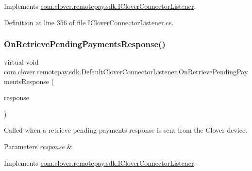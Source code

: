 Implements \hyperlink{interfacecom_1_1clover_1_1remotepay_1_1sdk_1_1_i_clover_connector_listener_a80b66ca256c60f88d9c3bc1bf7df1a25}{com.\+clover.\+remotepay.\+sdk.\+I\+Clover\+Connector\+Listener}.



Definition at line 356 of file I\+Clover\+Connector\+Listener.\+cs.

\mbox{\label{classcom_1_1clover_1_1remotepay_1_1sdk_1_1_default_clover_connector_listener_afb505c42e77209a31ce61911641f40cf}} 
\subsubsection{\texorpdfstring{On\+Retrieve\+Pending\+Payments\+Response()}{OnRetrievePendingPaymentsResponse()}}
{\footnotesize\ttfamily virtual void com.\+clover.\+remotepay.\+sdk.\+Default\+Clover\+Connector\+Listener.\+On\+Retrieve\+Pending\+Payments\+Response (\begin{DoxyParamCaption}\item[{\hyperlink{classcom_1_1clover_1_1remotepay_1_1sdk_1_1_retrieve_pending_payments_response}{Retrieve\+Pending\+Payments\+Response}}]{response }\end{DoxyParamCaption})\hspace{0.3cm}{\ttfamily [virtual]}}



Called when a retrieve pending payments response is sent from the Clover device. 


\begin{DoxyParams}{Parameters}
{\em response} & \\
\hline
\end{DoxyParams}


Implements \hyperlink{interfacecom_1_1clover_1_1remotepay_1_1sdk_1_1_i_clover_connector_listener_a3567d50af6c179c41d0a47eaf4e5127b}{com.\+clover.\+remotepay.\+sdk.\+I\+Clover\+Connector\+Listener}.



